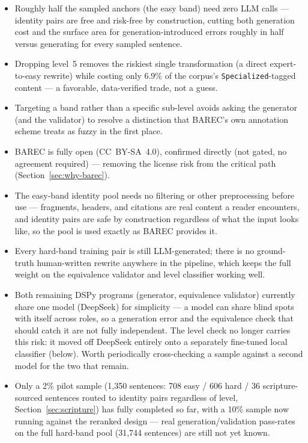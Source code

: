 \documentclass[11pt,a4paper]{article}
\newcommand{\proscons}[2]{%
  \begin{minipage}[t]{0.485\textwidth}
    \begin{prosbox}
      \begin{itemize}[leftmargin=1.1em,itemsep=1pt,topsep=1pt]
        #1
      \end{itemize}
    \end{prosbox}
  \end{minipage}\hfill
  \begin{minipage}[t]{0.485\textwidth}
    \begin{consbox}
      \begin{itemize}[leftmargin=1.1em,itemsep=1pt,topsep=1pt]
        #2
      \end{itemize}
    \end{consbox}
  \end{minipage}
}
\begin{document}
\proscons{
  \item Roughly half the sampled anchors (the easy band) need zero LLM calls
  --- identity pairs are free and risk-free by construction, cutting both
  generation cost and the surface area for generation-introduced errors
  roughly in half versus generating for every sampled sentence.
  \item Dropping level~5 removes the riskiest single transformation
  (a direct expert-to-easy rewrite) while costing only 6.9\% of the corpus's
  \texttt{Specialized}-tagged content --- a favorable, data-verified trade,
  not a guess.
  \item Targeting a band rather than a specific sub-level avoids asking the
  generator (and the validator) to resolve a distinction that BAREC's own
  annotation scheme treats as fuzzy in the first place.
  \item BAREC is fully open (CC~BY-SA~4.0), confirmed directly (not gated,
  no agreement required) --- removing the license risk from the critical
  path (Section~\ref{sec:why-barec}).
  \item The easy-band identity pool needs no filtering or other
  preprocessing before use --- fragments, headers, and citations are real
  content a reader encounters, and identity pairs are safe by construction
  regardless of what the input looks like, so the pool is used exactly as
  BAREC provides it.
}{
  \item Every hard-band training pair is still LLM-generated; there is no
  ground-truth human-written rewrite anywhere in the pipeline, which keeps
  the full weight on the equivalence validator and level classifier
  working well.
  \item Both remaining DSPy programs (generator, equivalence validator)
  currently share one model (DeepSeek) for simplicity --- a model can share
  blind spots with itself across roles, so a generation error and the
  equivalence check that should catch it are not fully independent. The
  level check no longer carries this risk: it moved off DeepSeek entirely
  onto a separately fine-tuned local classifier (below). Worth periodically
  cross-checking a sample against a second model for the two that remain.
  \item Only a 2\% pilot sample (1,350 sentences: 708 easy / 606 hard / 36
  scripture-sourced sentences routed to identity pairs regardless of level,
  Section~\ref{sec:scripture}) has fully completed so far, with a 10\%
  sample now running against the reranked design --- real
  generation/validation pass-rates on the full hard-band pool (31,744
  sentences) are still not yet known.
}
\end{document}
